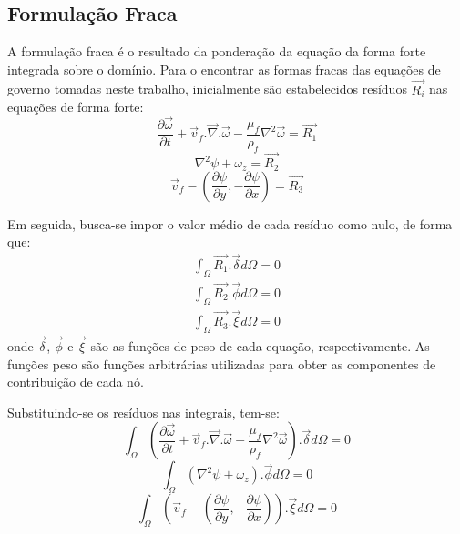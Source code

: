 \subsection{\textbf{Formulação Fraca}}
A formulação fraca é o resultado da ponderação da equação da forma forte integrada sobre o domínio.
Para o encontrar as formas fracas das equações de governo tomadas neste trabalho, inicialmente são estabelecidos resíduos $\vec{R_i}$ nas equações de forma forte:
\begin{equation}
    \dfrac{\partial \vec{\omega}}{\partial t} +
    \vec{v}_f.\vec{\nabla}.\vec{\omega} -
    \dfrac{\mu_f}{\rho_f} \nabla^2 \vec{\omega} =
    \vec{R_1}
\end{equation}
\begin{equation}
    \nabla^2\psi +
    \omega_z =
    \vec{R_2}
\end{equation}
\begin{equation}
    \vec{v}_f - \left(\dfrac{\partial \psi}{\partial y},
    -\dfrac{\partial \psi}{\partial x} \right) =
    \vec{R_3}
\end{equation}

Em seguida, busca-se impor o valor médio de cada resíduo como nulo, de forma que:
\begin{align}
    \int_{\Omega} \vec{R_1} . \vec{\delta} d\Omega = 0 \\
    \int_{\Omega} \vec{R_2} . \vec{\phi} d\Omega = 0\\
    \int_{\Omega} \vec{R_3} . \vec{\xi} d\Omega = 0
\end{align}
onde $\vec{\delta}$, $\vec{\phi}$ e $\vec{\xi}$ são as funções de peso de cada equação, respectivamente.
As funções peso são funções arbitrárias utilizadas para obter as componentes de contribuição de cada nó.

Substituindo-se os resíduos nas integrais, tem-se:
\begin{equation}
    \int_{\Omega} \left(
    \dfrac{\partial \vec{\omega}}{\partial t} +
    \vec{v}_f.\vec{\nabla}.\vec{\omega} -
    \dfrac{\mu_f}{\rho_f} \nabla^2 \vec{\omega}
    \right).\vec{\delta} d\Omega = 0
\end{equation}
\begin{equation}
    \int_{\Omega} \left(
    \nabla^2\psi +
    \omega_z
    \right).\vec{\phi} d\Omega = 0
\end{equation}
\begin{equation}
    \int_{\Omega} \left(
    \vec{v}_f - \left(\dfrac{\partial \psi}{\partial y},
    -\dfrac{\partial \psi}{\partial x} \right)
    \right).\vec{\xi} d\Omega = 0
\end{equation}

